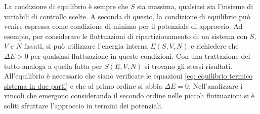 La condizione di equilibrio è sempre che $S$ sia massima, qualsiasi sia l'insieme di variabili di controllo scelte. A seconda di questo, la condizione di equilibrio può venire espressa come condizione di minimo per il potenziale di approccio. Ad esempio, per considerare le fluttuazioni di ripartizionamento di un sistema con $S$, $V$ e $N$ fissati, si può utilizzare l'energia interna $E(S, V, N)$ e richiedere che $\Delta E > 0$ per qualsiasi fluttuazione in queste condizioni. Con una trattazione del tutto analoga a quella fatta per $S(E, V, N)$ si trovano gli stessi risultati. All'equilibrio è necessario che siano verificate le equazioni \eqref{eq: equilibrio termico sistema in due parti} e che al primo ordine si abbia $\Delta E = 0$. Nell'analizzare i vincoli che emergono considerando il secondo ordine nelle piccoli fluttuazioni si è soliti sfruttare l'approccio in termini dei potenziali.

